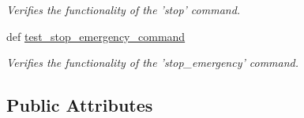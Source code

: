\begin{DoxyCompactItemize}
\begin{DoxyCompactList}\small\item\em Verifies the functionality of the 'stop' command. \end{DoxyCompactList}\item 
def \hyperlink{classhwm_1_1hardware_1_1devices_1_1drivers_1_1mxl__antenna__controller_1_1tests_1_1test__mxl__anf1b82778ca0869b41ace53be3d0454a2_a7ea0510ec6f64c53aa6d9859c2a38308}{test\-\_\-stop\-\_\-emergency\-\_\-command}
\begin{DoxyCompactList}\small\item\em Verifies the functionality of the 'stop\-\_\-emergency' command. \end{DoxyCompactList}\end{DoxyCompactItemize}
\subsection*{Public Attributes}
